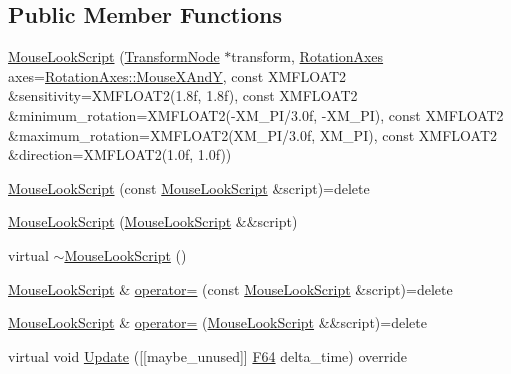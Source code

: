 \subsection*{Public Member Functions}
\begin{DoxyCompactItemize}
\item 
\hyperlink{classmage_1_1script_1_1_mouse_look_script_a9eb1d0a731b1402cdfef706b9ecc8143}{Mouse\+Look\+Script} (\hyperlink{classmage_1_1_transform_node}{Transform\+Node} $\ast$transform, \hyperlink{classmage_1_1script_1_1_mouse_look_script_aa8c8ce1a3e6ccefa7b8ddd31be209c23}{Rotation\+Axes} axes=\hyperlink{classmage_1_1script_1_1_mouse_look_script_aa8c8ce1a3e6ccefa7b8ddd31be209c23a109431b32c091e8a7ad541546c66c522}{Rotation\+Axes\+::\+Mouse\+X\+AndY}, const X\+M\+F\+L\+O\+A\+T2 \&sensitivity=X\+M\+F\+L\+O\+A\+T2(1.\+8f, 1.\+8f), const X\+M\+F\+L\+O\+A\+T2 \&minimum\+\_\+rotation=\+X\+M\+F\+L\+O\+A\+T2(-\/\+X\+M\+\_\+\+P\+I/3.\+0f, -\/\+X\+M\+\_\+\+P\+I), const X\+M\+F\+L\+O\+A\+T2 \&maximum\+\_\+rotation=\+X\+M\+F\+L\+O\+A\+T2(\+X\+M\+\_\+\+P\+I/3.\+0f, X\+M\+\_\+\+P\+I), const X\+M\+F\+L\+O\+A\+T2 \&direction=\+X\+M\+F\+L\+O\+A\+T2(1.\+0f, 1.\+0f))
\item 
\hyperlink{classmage_1_1script_1_1_mouse_look_script_acd2b333978c5310a82ee9b22b7873ad6}{Mouse\+Look\+Script} (const \hyperlink{classmage_1_1script_1_1_mouse_look_script}{Mouse\+Look\+Script} \&script)=delete
\item 
\hyperlink{classmage_1_1script_1_1_mouse_look_script_a73a93dbad87071681ecd896c7429fefa}{Mouse\+Look\+Script} (\hyperlink{classmage_1_1script_1_1_mouse_look_script}{Mouse\+Look\+Script} \&\&script)
\item 
virtual \hyperlink{classmage_1_1script_1_1_mouse_look_script_a29a6d2cb4742fbf745822d015e72484f}{$\sim$\+Mouse\+Look\+Script} ()
\item 
\hyperlink{classmage_1_1script_1_1_mouse_look_script}{Mouse\+Look\+Script} \& \hyperlink{classmage_1_1script_1_1_mouse_look_script_af7da565d15422579ab5ff34f8f6bbc6a}{operator=} (const \hyperlink{classmage_1_1script_1_1_mouse_look_script}{Mouse\+Look\+Script} \&script)=delete
\item 
\hyperlink{classmage_1_1script_1_1_mouse_look_script}{Mouse\+Look\+Script} \& \hyperlink{classmage_1_1script_1_1_mouse_look_script_a019b949f86d066507ea74a9db126137e}{operator=} (\hyperlink{classmage_1_1script_1_1_mouse_look_script}{Mouse\+Look\+Script} \&\&script)=delete
\item 
virtual void \hyperlink{classmage_1_1script_1_1_mouse_look_script_a6d38748c21a6bc475e8ac31e24459053}{Update} (\mbox{[}\mbox{[}maybe\+\_\+unused\mbox{]}\mbox{]} \hyperlink{namespacemage_ad26233bbec640deda836e572c1a23708}{F64} delta\+\_\+time) override

\end{DoxyCompactItemize}
